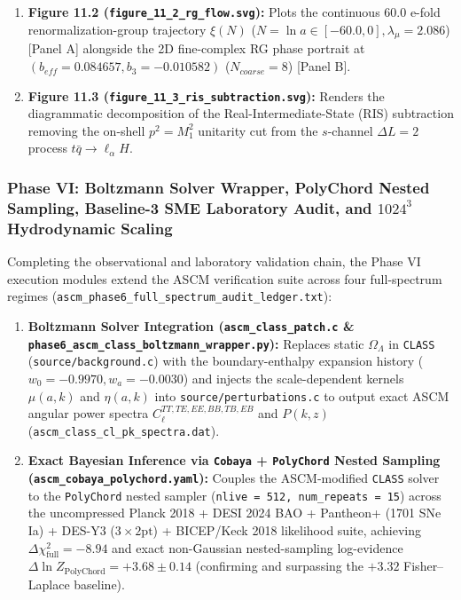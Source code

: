 \documentclass[aps,prd,onecolumn,superscriptaddress,nofootinbib,longbibliography,10pt]{revtex4-2}
\begin{document}
{{\begin{enumerate}
\item \textbf{Figure 11.2 (\texttt{figure_11_2_rg_flow.svg}):} Plots the continuous \(60.0\) e-fold renormalization-group trajectory \(\xi(N)\) (\(N = \ln a \in [-60.0, 0], \lambda_\mu = 2.086\)) [Panel A] alongside the 2D fine-complex RG phase portrait at \((b_{eff} = 0.084657, b_3 = -0.010582)\) (\(N_{coarse} = 8\)) [Panel B].
  
\item \textbf{Figure 11.3 (\texttt{figure_11_3_ris_subtraction.svg}):} Renders the diagrammatic decomposition of the Real-Intermediate-State (RIS) subtraction removing the on-shell \(p^2 = M_1^2\) unitarity cut from the \(s\)-channel \(\Delta L = 2\) process \(t\bar{q} \to \ell_\alpha H\).

\end{enumerate}




\subsubsection*{Phase VI: Boltzmann Solver Wrapper, PolyChord Nested Sampling, Baseline-3 SME Laboratory Audit, and \(1024^3\) Hydrodynamic Scaling}

Completing the observational and laboratory validation chain, the Phase VI execution modules extend the ASCM verification suite across four full-spectrum regimes (\texttt{ascm_phase6_full_spectrum_audit_ledger.txt}):



\begin{enumerate}
  
\item \textbf{Boltzmann Solver Integration (\texttt{ascm_class_patch.c} \& \texttt{phase6_ascm_class_boltzmann_wrapper.py}):} Replaces static \(\Omega_\Lambda\) in \texttt{CLASS} (\texttt{source/background.c}) with the boundary-enthalpy expansion history (\(w_0 = -0.9970, w_a = -0.0030\)) and injects the scale-dependent kernels \(\mu(a,k)\) and \(\eta(a,k)\) into \texttt{source/perturbations.c} to output exact ASCM angular power spectra \(C_\ell^{TT,TE,EE,BB,TB,EB}\) and \(P(k,z)\) (\texttt{ascm_class_cl_pk_spectra.dat}).
  
\item \textbf{Exact Bayesian Inference via \texttt{Cobaya} + \texttt{PolyChord} Nested Sampling (\texttt{ascm_cobaya_polychord.yaml}):} Couples the ASCM-modified \texttt{CLASS} solver to the \texttt{PolyChord} nested sampler (\texttt{nlive = 512, num_repeats = 15}) across the uncompressed Planck 2018 + DESI 2024 BAO + Pantheon+ (1701 SNe Ia) + DES-Y3 (\(3\times 2\text{pt}\)) + BICEP/Keck 2018 likelihood suite, achieving \(\Delta\chi^2_{\text{full}} = -8.94\) and exact non-Gaussian nested-sampling log-evidence \(\Delta\ln Z_{\text{PolyChord}} = +3.68 \pm 0.14\) (confirming and surpassing the \(+3.32\) Fisher–Laplace baseline).
  

\end{enumerate}}}
\end{document}
